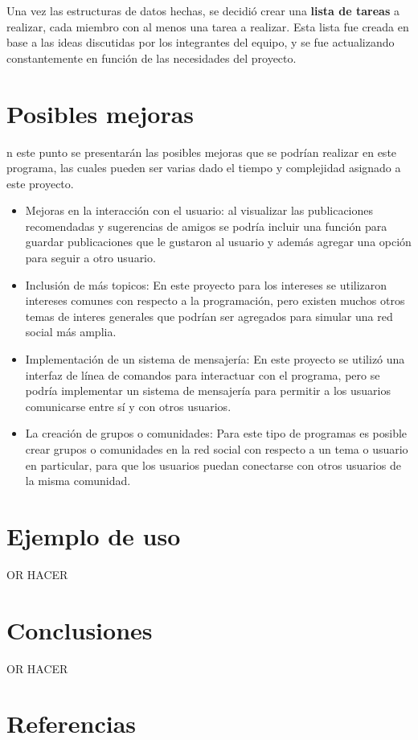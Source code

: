 \documentclass[9pt,letterpaper,onecolumn]{rho-class/rho}
\begin{document}
    \vspace{0.5cm}

    Una vez las estructuras de datos hechas, se decidió crear una \textbf{lista de tareas} a realizar, cada miembro con al menos una tarea a realizar. Esta lista fue creada en base a las ideas discutidas por los integrantes del equipo, y se fue actualizando constantemente en función de las necesidades del proyecto.


\newpage
\section{Posibles mejoras}

    n este punto se presentarán las posibles mejoras que se podrían realizar en este programa, las cuales pueden ser varias dado el tiempo y complejidad asignado a este proyecto.

    \begin{itemize}
        \item Mejoras en la interacción con el usuario: al visualizar las publicaciones recomendadas y sugerencias de amigos se podría incluir una función para guardar publicaciones que le gustaron al usuario y además agregar una opción para seguir a otro usuario.
        \vspace{0.3cm}
        \item Inclusión de más topicos: En este proyecto para los intereses se utilizaron intereses comunes con respecto a la programación, pero existen muchos otros temas de interes generales que podrían ser agregados para simular una red social más amplia.
        \vspace{0.3cm}
        \item Implementación de un sistema de mensajería: En este proyecto se utilizó una interfaz de línea de comandos para interactuar con el programa, pero se podría implementar un sistema de mensajería para permitir a los usuarios comunicarse entre sí y con otros usuarios.
        \vspace{0.3cm}
        \item La creación de grupos o comunidades: Para este tipo de programas es posible crear grupos o comunidades en la red social con respecto a un tema o usuario en particular, para que los usuarios puedan conectarse con otros usuarios de la misma comunidad.
    \end{itemize}

\newpage
\section{Ejemplo de uso}

    OR HACER

\newpage
\section{Conclusiones}

    OR HACER


\newpage
\section{Referencias}


\end{document}
